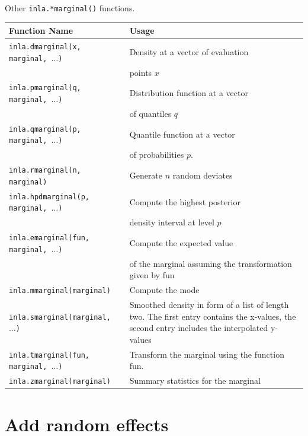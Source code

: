 \documentclass[
  ignorenonframetext,
]{beamer}
\begin{document}
\begin{frame}{Other \texttt{inla.*marginal()} functions.}
\protect\hypertarget{other-inla.marginal-functions.}{}
\scriptsize
\begin{table}[h]
\centering
    \begin{tabular}{l|p{6cm}}
     \bf{Function Name} & \bf{Usage}\\\hline\hline
      \tt{inla.dmarginal(x, marginal, $\dots$)} & Density at a vector of
      evaluation  \\
      & points $x$ \\
      \tt{inla.pmarginal(q, marginal, $\dots$)} & Distribution function at a vector  \\
      &  of
      quantiles $q$ \\
      \tt{inla.qmarginal(p, marginal, $\dots$)} & Quantile function at a vector \\
      & of
      probabilities $p$.\\
      \tt{inla.rmarginal(n, marginal)} & Generate $n$ random deviates \\
      \tt{inla.hpdmarginal(p, marginal, $\dots$)} & Compute the highest posterior \\
      & density
      interval at level $p$\\
      \tt{inla.emarginal(fun, marginal, $\dots$)} & Compute the expected value \\
      & of the
      marginal assuming the transformation given by fun\\
      \tt{inla.mmarginal(marginal)} & Compute the mode\\
      \tt{inla.smarginal(marginal, $\dots$)} & Smoothed density in
      form of a list of length two. The first entry contains the x-values, the second
      entry includes the interpolated y-values\\
      \tt{inla.tmarginal(fun, marginal, $\dots$)} & Transform the marginal using the
      function fun.\\
      \tt{inla.zmarginal(marginal)} & Summary statistics for the marginal\\
    \end{tabular}
\end{table}
\normalsize
\end{frame}

\hypertarget{add-random-effects}{%
\section{Add random effects}\label{add-random-effects}}
\end{document}
